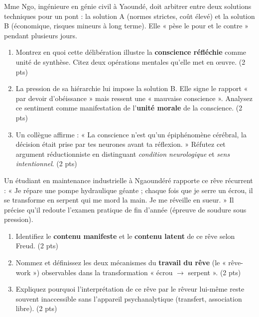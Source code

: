 \documentclass[11pt]{article}
\begin{document}
\begin{exercice}
Mme Ngo, ingénieure en génie civil à Yaoundé, doit arbitrer entre deux solutions techniques pour un pont : la solution A (normes strictes, coût élevé) et la solution B (économique, risques mineurs à long terme). Elle « pèse le pour et le contre » pendant plusieurs jours.
\begin{enumerate}
    \item Montrez en quoi cette délibération illustre la \textbf{conscience réfléchie} comme unité de synthèse. Citez deux opérations mentales qu'elle met en œuvre. (2 pts)
    \item La pression de sa hiérarchie lui impose la solution B. Elle signe le rapport « par devoir d'obéissance » mais ressent une « mauvaise conscience ». Analysez ce sentiment comme manifestation de l'\textbf{unité morale} de la conscience. (2 pts)
    \item Un collègue affirme : « La conscience n'est qu'un épiphénomène cérébral, la décision était prise par tes neurones avant ta réflexion. » Réfutez cet argument réductionniste en distinguant \textit{condition neurologique} et \textit{sens intentionnel}. (2 pts)
\end{enumerate}
\end{exercice}

\begin{exercice}
Un étudiant en maintenance industrielle à Ngaoundéré rapporte ce rêve récurrent : « Je répare une pompe hydraulique géante ; chaque fois que je serre un écrou, il se transforme en serpent qui me mord la main. Je me réveille en sueur. » Il précise qu'il redoute l'examen pratique de fin d'année (épreuve de soudure sous pression).
\begin{enumerate}
    \item Identifiez le \textbf{contenu manifeste} et le \textbf{contenu latent} de ce rêve selon Freud. (2 pts)
    \item Nommez et définissez les deux mécanismes du \textbf{travail du rêve} (le « rêve-work ») observables dans la transformation « écrou $\rightarrow$ serpent ». (2 pts)
    \item Expliquez pourquoi l'interprétation de ce rêve par le rêveur lui-même reste souvent inaccessible sans l'appareil psychanalytique (transfert, association libre). (2 pts)
\end{enumerate}
\end{exercice}
\end{document}
